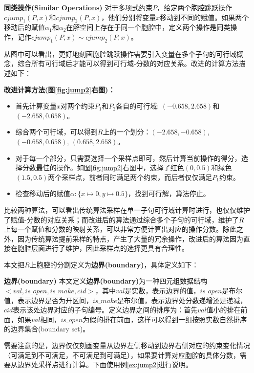 \begin{example}
\begin{definition}{\textbf{同类操作(Similar Operations)}}
    对于多项式约束$P$，给定两个胞腔跳跃操作$cjump_1(P, x)$和$cjump_2(P, x)$，他们分别将变量$x$移动到不同的赋值。如果两个移动后的赋值$\alpha_1$和$\alpha_2$在解空间上存在于同一个胞腔中，定义两个操作是同类操作，记作$cjump_1(P, x) \sim cjump_2(P, x)$。
\end{definition}
从图中可以看出，更好地刻画胞腔跳跃操作需要引入变量在多个子句的可行域概念，综合所有可行域后才能可以得到可行域-分数的对应关系。改进的计算方法描述如下：

\textbf{改进计算方法(图\ref{fig:jump2}右图)：}
\begin{itemize}
    \item 首先计算变量$x$对两个约束$P_1$和$P_2$各自的可行域: $(-0.658, 2.658)$和$(-2.658, 0.658)$。
    \item 综合两个可行域，可以得到$R$上的一个划分：$(-2.658, -0.658)$, $(-0.658, 0.658)$, $(0.658, 2.658)$。
    \item 对于每一个部分，只需要选择一个采样点即可，然后计算当前操作的得分，选择分数最佳的操作。如图\ref{fig:jump2}右图中，选择了红色$(0, 0.5)$和绿色$(1.5, 0.5)$两个采样点，前者同时满足两个约束，而后者仅仅满足$P_1$约束。
    \item 检查移动后的赋值$\alpha: \{x \mapsto 0, y \mapsto 0.5\}$，找到可行解，算法停止。
\end{itemize}
比较两种算法，可以看出传统算法采样在单一子句可行域计算时进行，也仅仅维护了赋值-分数的对应关系；而改进后的算法通过综合多个子句的可行域，维护了$R$上每一个赋值和分数的映射关系，可以非常方便计算出对应的操作分数。除此之外，因为传统算法提前采样的特点，产生了大量的冗余操作，改进后的算法因为直接在胞腔层面进行了维护，因此采样点的选择更具有合理性。
\end{example}

本文把$R$上胞腔的分割定义为\textbf{边界(boundary)}，具体定义如下：
\begin{definition}{\textbf{边界(boundary)}}
本文定义\textbf{边界(boundary)}为一种四元组数据结构$<val, is\_open, is\_make, cid>$，其中$val$是实数，表示边界的值，$is\_open$是布尔值，表示边界是否为开区间，$is\_make$是布尔值，表示边界处分数递增还是递减，$cid$表示该处边界对应的子句编号。定义边界之间的排序为：首先$val$值小的排在前面，如果$val$相同，$is\_open$为假的排在前面，这样可以得到一组按照实数自然排序的边界集合(boundary set)。
\end{definition}
需要注意的是，边界仅仅刻画变量从边界左侧移动到边界右侧对应的约束变化情况（可满足到不可满足，不可满足到可满足），如果要计算对应胞腔的具体分数，需要从边界处采样点进行计算。下面使用例\ref{ex:jump2}进行说明。

